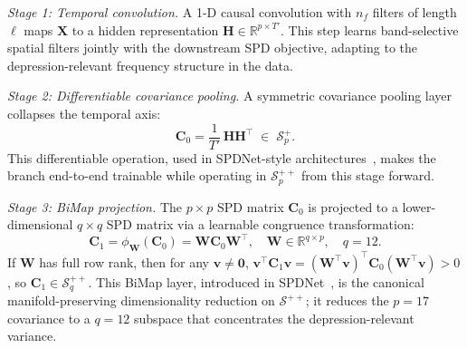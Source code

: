 \textit{Stage 1: Temporal convolution.}
A 1-D causal convolution with $n_f$ filters of length $\ell$ maps $\mathbf{X}$
to a hidden representation $\mathbf{H}\in\mathbb{R}^{p\times T'}$.
This step learns band-selective spatial filters jointly with the downstream SPD
objective, adapting to the depression-relevant frequency structure in the data.

\textit{Stage 2: Differentiable covariance pooling.}
A symmetric covariance pooling layer collapses the temporal axis:
\begin{equation}
  \mathbf{C}_0 = \frac{1}{T'}\,\mathbf{H}\mathbf{H}^\top
    \;\in\;\mathcal{S}^{+}_p.
  \label{eq:cov_pool}
\end{equation}
This differentiable operation, used in SPDNet-style
architectures~\cite{huang2017riemannian,cheng2026spd}, makes the branch
end-to-end trainable while operating in $\mathcal{S}^{++}_p$ from this stage
forward.

\textit{Stage 3: BiMap projection.}
The $p\times p$ SPD matrix $\mathbf{C}_0$ is projected to a lower-dimensional
$q\times q$ SPD matrix via a learnable congruence transformation:
\begin{equation}
  \mathbf{C}_1 = \phi_\mathbf{W}(\mathbf{C}_0) = \mathbf{W}\mathbf{C}_0\mathbf{W}^\top,
  \quad \mathbf{W}\in\mathbb{R}^{q\times p},\quad q = 12.
  \label{eq:bimap}
\end{equation}
If $\mathbf{W}$ has full row rank, then for any $\mathbf{v}\neq\mathbf{0}$,
$\mathbf{v}^\top\mathbf{C}_1\mathbf{v} = (\mathbf{W}^\top\mathbf{v})^\top
\mathbf{C}_0(\mathbf{W}^\top\mathbf{v}) > 0$, so
$\mathbf{C}_1\in\mathcal{S}^{++}_q$.
This BiMap layer, introduced in SPDNet~\cite{huang2017riemannian}, is the
canonical manifold-preserving dimensionality reduction on $\mathcal{S}^{++}$;
it reduces the $p\!=\!17$ covariance to a $q\!=\!12$ subspace that concentrates
the depression-relevant variance.

